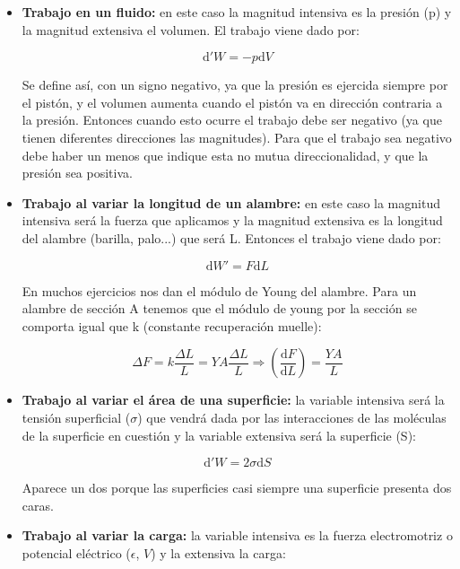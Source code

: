 \documentclass[12pt,a4paper]{article}
\newcommand{\D}{\mathrm{d}}
\newcommand{\parentesis}[1]{\left( #1 \right)}
\begin{document}
\begin{itemize}

\item \textbf{Trabajo en un fluido:} en este caso la magnitud intensiva es la presión (p) y la magnitud extensiva el volumen. El trabajo viene dado por:

\begin{equation}
\D ' W = - p \D V
\end{equation}

Se define así, con un signo negativo, ya que la presión es ejercida siempre por el pistón, y el volumen aumenta cuando el pistón va en dirección contraria a la presión. Entonces cuando esto ocurre el trabajo debe ser negativo (ya que tienen diferentes direcciones las magnitudes). Para que el trabajo sea negativo debe haber un menos que indique esta no mutua direccionalidad, y que la presión sea positiva. 

\item \textbf{Trabajo al  variar la longitud de un alambre:} en este caso la magnitud intensiva será la fuerza que aplicamos y la magnitud extensiva es la longitud del alambre (barilla, palo...) que será L. Entonces el trabajo viene dado por:

\begin{equation}
\D W' = F \D L
\end{equation}

En muchos ejercicios nos dan el módulo de Young del alambre. Para un alambre de sección A tenemos que el módulo de young por la sección se comporta igual que k (constante recuperación muelle):

\begin{equation}
\Delta F = k \dfrac{\Delta L}{L} = Y A \dfrac{\Delta L}{L} \Longrightarrow \parentesis{\dfrac{\D F}{\D L}}= \dfrac{Y A}{L}
\end{equation}

\item \textbf{Trabajo al variar el área de una superficie:} la variable intensiva será la tensión superficial ($\sigma$) que vendrá dada por las interacciones de las moléculas de la superficie en cuestión y la variable extensiva será la superficie (S):

\begin{equation}
\D ' W = 2 \sigma \D S
\end{equation}

Aparece un dos porque las superficies casi siempre una superficie presenta dos caras. 

\item \textbf{Trabajo al variar la carga:} la variable intensiva es la fuerza electromotriz o potencial eléctrico ($\epsilon$, $V$) y la extensiva la carga:


\end{itemize}
\end{document}
